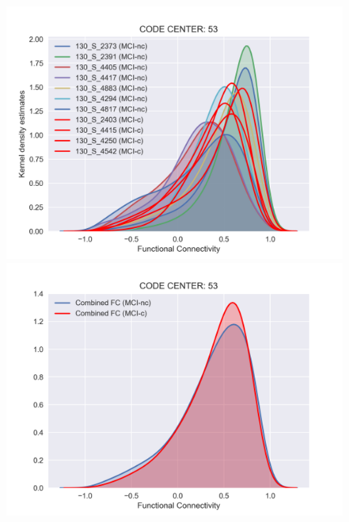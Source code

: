 \documentclass[a4paper,12pt]{elsarticle}  %
\begin{document}
\begin{figure}[h]
\begin{minipage}{.5\textwidth}
				\centering
				\includegraphics[width=1\linewidth]{fig_distFC_individual_centre_53.png}
			\end{minipage}%
			\begin{minipage}{.5\textwidth}
				\centering
				\includegraphics[width=1\linewidth]{fig_distFC_mitjana_centre_53.png}
			\end{minipage}		
			\begin{minipage}{.5\textwidth}
				\centering

\end{minipage}
\end{figure}
\end{document}
